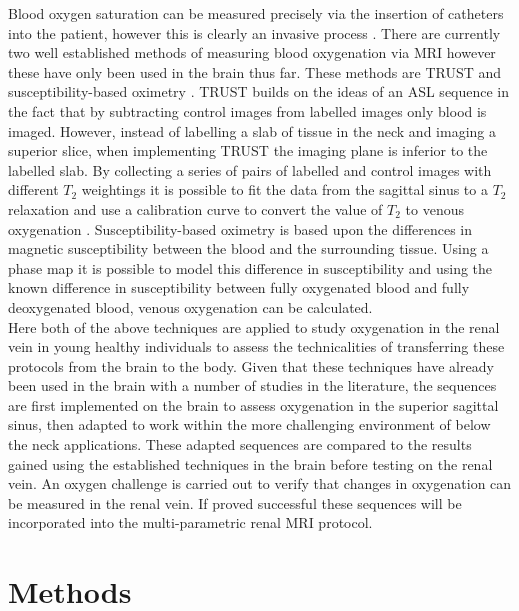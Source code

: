Blood oxygen saturation can be measured precisely via the insertion of catheters into the patient, however this is clearly an invasive process \cite{nagdyman_comparison_2005}. There are currently two well established methods of measuring blood oxygenation via \ac{MRI} however these have only been used in the brain thus far. These methods are \ac{TRUST} \cite{lu_quantitative_2008, xu_improving_2012, liu_testretest_2013, liu_multi-site_2016} and susceptibility-based oximetry \cite{jain_mri_2010, jain_cerebral_2014, driver_global_2014, lee_multiplexed_2017}. \ac{TRUST} builds on the ideas of an \ac{ASL} sequence in the fact that by subtracting control images from labelled images only blood is imaged. However, instead of labelling a slab of tissue in the neck and imaging a superior slice, when implementing \ac{TRUST} the imaging plane is inferior to the labelled slab. By collecting a series of pairs of labelled and control images with different $T_2$ weightings it is possible to fit the data from the sagittal sinus to a $T_2$ relaxation and use a calibration curve to convert the value of $T_2$ to venous oxygenation \cite{wright_estimating_1991}. Susceptibility-based oximetry is based upon the differences in magnetic susceptibility between the blood and the surrounding tissue. Using a phase map it is possible to model this difference in susceptibility and using the known difference in susceptibility between fully oxygenated blood and fully deoxygenated blood, venous oxygenation can be calculated.\\

Here both of the above techniques are applied to study oxygenation in the renal vein in young healthy individuals to assess the technicalities of transferring these protocols from the brain to the body. Given that these techniques have already been used in the brain with a number of studies in the literature, the sequences are first implemented on the brain to assess oxygenation in the superior sagittal sinus, then adapted to work within the more challenging environment of below the neck applications. These adapted sequences are compared to the results gained using the established techniques in the brain before testing on the renal vein. An oxygen challenge is carried out to verify that changes in oxygenation can be measured in the renal vein. If proved successful these sequences will be incorporated into the multi-parametric renal \ac{MRI} protocol.\\

\newpage
\section{Methods}

